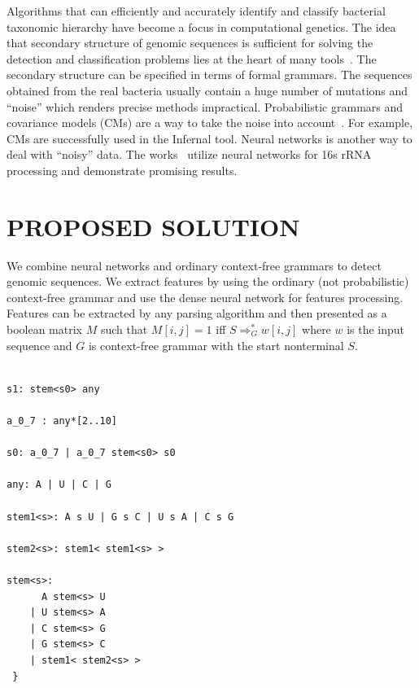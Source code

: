 \documentclass[a4paper,twoside]{article}
\begin{document}
\noindent Algorithms that can efficiently and accurately identify and classify bacterial taxonomic hierarchy have become a focus in computational genetics.
The idea that secondary structure of genomic sequences is sufficient for solving the detection and classification problems lies at the heart of many tools~\cite{GrammarsRNA,PCFG,meta,LWPCFG}. 
The secondary structure can be specified in terms of formal grammars. 
The sequences obtained from the real bacteria usually contain a huge number of mutations and ``noise'' which renders precise methods impractical. 
Probabilistic grammars and covariance models (CMs) are a way to take the noise into account~\cite{EddyDurbin}.
For example, CMs are successfully used in the Infernal tool.%
Neural networks is another way to deal with ``noisy'' data. 
The works~\cite{Humidor,ANN} utilize neural networks for 16s rRNA processing and demonstrate promising results. 
%

\section{\uppercase{Proposed solution}}
\label{sec:proposedSolution}

\noindent We combine neural networks and ordinary context-free grammars to detect genomic sequences. 
We extract features by using the ordinary (not probabilistic) context-free grammar and use the dense neural network for features processing.
Features can be extracted by any parsing algorithm and then presented as a boolean matrix $M$ such that $M[i,j]=1$ iff $S \Rightarrow^*_G w[i,j]$ where $w$ is the input sequence and $G$ is context-free grammar with the start nonterminal $S$.

\begin{verbatim}

s1: stem<s0> any

a_0_7 : any*[2..10]

s0: a_0_7 | a_0_7 stem<s0> s0

any: A | U | C | G

stem1<s>: A s U | G s C | U s A | C s G 

stem2<s>: stem1< stem1<s> >

stem<s>:  
      A stem<s> U 
    | U stem<s> A 
    | C stem<s> G 
    | G stem<s> C 
    | stem1< stem2<s> >  
 } 
\end{verbatim}
\end{document}
